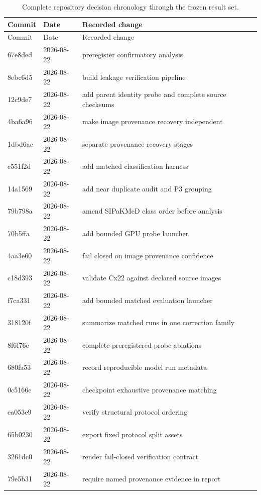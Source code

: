 \begin{longtable}{p{1.5cm}p{2.0cm}p{11.5cm}}
\caption{Complete repository decision chronology through the frozen result set.}\label{s1:tab:git-timeline}\\
\toprule
Commit & Date & Recorded change \\
\midrule
\endfirsthead
\toprule
Commit & Date & Recorded change \\
\midrule
\endhead
\bottomrule
\endfoot
67e8ded & 2026-08-22 & preregister confirmatory analysis \\ 
8ebc6d5 & 2026-08-22 & build leakage verification pipeline \\ 
12c9de7 & 2026-08-22 & add parent identity probe and complete source checksums \\ 
4ba6a96 & 2026-08-22 & make image provenance recovery independent \\ 
1dbd6ac & 2026-08-22 & separate provenance recovery stages \\ 
c551f2d & 2026-08-22 & add matched classification harness \\ 
14a1569 & 2026-08-22 & add near duplicate audit and P3 grouping \\ 
79b798a & 2026-08-22 & amend SIPaKMeD class order before analysis \\ 
70b5ffa & 2026-08-22 & add bounded GPU probe launcher \\ 
4aa3e60 & 2026-08-22 & fail closed on image provenance confidence \\ 
c18d393 & 2026-08-22 & validate Cx22 against declared source images \\ 
f7ca331 & 2026-08-22 & add bounded matched evaluation launcher \\ 
318120f & 2026-08-22 & summarize matched runs in one correction family \\ 
8f6f76e & 2026-08-22 & complete preregistered probe ablations \\ 
680fa53 & 2026-08-22 & record reproducible model run metadata \\ 
0c5166e & 2026-08-22 & checkpoint exhaustive provenance matching \\ 
ea053e9 & 2026-08-22 & verify structural protocol ordering \\ 
65b0230 & 2026-08-22 & export fixed protocol split assets \\ 
3261dc0 & 2026-08-22 & render fail-closed verification contract \\ 
79e5b31 & 2026-08-22 & require named provenance evidence in report \\ 

\end{longtable}
